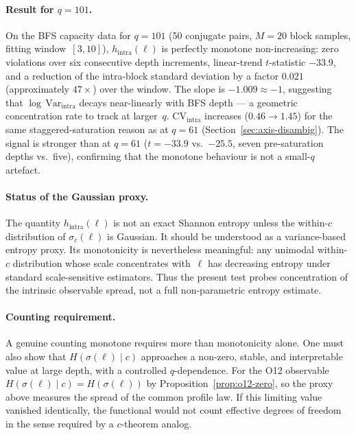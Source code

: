 \documentclass[11pt,a4paper]{article}
\theoremstyle{plain}
\theoremstyle{definition}
\theoremstyle{remark}
\begin{document}
  \paragraph{Result for $q = 101$.}
    On the BFS capacity data for $q = 101$
    (50 conjugate pairs, $M = 20$ block samples, fitting window~$[3, 10]$),
    $h_{\mathrm{intra}}(\ell)$ is perfectly monotone non-increasing:
    zero violations over six consecutive depth increments,
    linear-trend $t$-statistic $-33.9$,
    and a reduction of the intra-block standard deviation
    by a factor $0.021$ (approximately $47\times$) over the window.
    The slope is $-1.009 \approx -1$,
    suggesting that $\log\,\mathrm{Var}_{\mathrm{intra}}$ decays near-linearly with BFS depth
    --- a geometric concentration rate to track at larger~$q$.
    $\mathrm{CV}_{\mathrm{intra}}$ increases ($0.46 \to 1.45$) for the same
    staggered-saturation reason as at $q = 61$ (Section~\ref{sec:axis-disambig}).
    The signal is stronger than at $q = 61$ ($t = -33.9$ vs.\ $-25.5$,
    seven pre-saturation depths vs.\ five),
    confirming that the monotone behaviour is not a small-$q$ artefact.

  \paragraph{Status of the Gaussian proxy.}
    The quantity $h_{\mathrm{intra}}(\ell)$ is not an exact Shannon entropy
    unless the within-$c$ distribution of $\sigma_c(\ell)$ is Gaussian.
    It should be understood as a variance-based entropy proxy.
    Its monotonicity is nevertheless meaningful: any unimodal within-$c$
    distribution whose scale concentrates with~$\ell$ has decreasing entropy
    under standard scale-sensitive estimators.
    Thus the present test probes concentration of the intrinsic observable
    spread, not a full non-parametric entropy estimate.

  \paragraph{Counting requirement.}
    A genuine counting monotone requires more than monotonicity alone.
    One must also show that $H(\sigma(\ell) \mid c)$ approaches a non-zero,
    stable, and interpretable value at large depth, with a controlled $q$-dependence.
    For the O12 observable $H(\sigma(\ell) \mid c) = H(\sigma(\ell))$ by
    Proposition~\ref{prop:o12-zero}, so the proxy above measures the spread of the common
    profile law.
    If this limiting value vanished identically, the functional would not count
    effective degrees of freedom in the sense required by a $c$-theorem analog.
\end{document}
